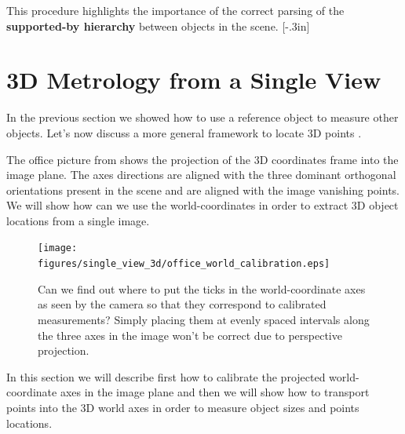 This procedure highlights the importance of the correct parsing of the {\bf supported-by hierarchy} between objects in the scene.
[-.3in]

\section{3D Metrology from a Single View}

In the previous section we showed how to use a reference object to measure other objects. Let's now discuss a more general framework to locate 3D points \cite{criminisi1999accurate}.

The office picture from \fig{\ref{fig:office_world_calibration}} shows the projection of the 3D coordinates frame into the image plane. The axes directions are aligned with the three dominant orthogonal orientations present in the scene and are aligned with the image vanishing points. We will show how can we use the world-coordinates in order to extract 3D object locations from a single image. 


\begin{figure}[t]
\centerline{
\texttt{[image: figures/single\_view\_3d/office\_world\_calibration.eps]}
} 
\caption{Can we find out where to put the ticks in the world-coordinate axes as seen by the camera so that they correspond to calibrated measurements? Simply placing them at evenly spaced intervals along the three axes in the image won't be correct due to perspective projection.}
\label{fig:office_world_calibration}
\end{figure}

In this section we will describe first how to calibrate the projected world-coordinate axes in the image plane and then we will show how to transport points into the 3D world axes in order to measure object sizes and points locations. 


